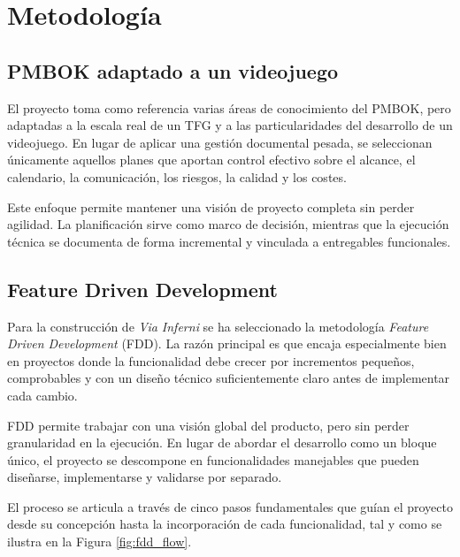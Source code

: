 \chapter{Metodología}

\begin{abstract}
En este capítulo se expone el marco metodológico que ha guiado el desarrollo de
\textit{Via Inferni}. La propuesta combina prácticas de planificación inspiradas en
PMBOK, un enfoque iterativo basado en FDD y una gestión del código orientada a mantener
trazabilidad y estabilidad durante el desarrollo.
\end{abstract}

\section{PMBOK adaptado a un videojuego}
El proyecto toma como referencia varias áreas de conocimiento del PMBOK, pero adaptadas a
la escala real de un TFG y a las particularidades del desarrollo de un videojuego. En
lugar de aplicar una gestión documental pesada, se seleccionan únicamente aquellos planes
que aportan control efectivo sobre el alcance, el calendario, la comunicación, los
riesgos, la calidad y los costes.

Este enfoque permite mantener una visión de proyecto completa sin perder agilidad. La
planificación sirve como marco de decisión, mientras que la ejecución técnica se documenta
de forma incremental y vinculada a entregables funcionales.

\section{Feature Driven Development}
Para la construcción de \textit{Via Inferni} se ha seleccionado la metodología
\textit{Feature Driven Development} (FDD). La razón principal es que encaja especialmente
bien en proyectos donde la funcionalidad debe crecer por incrementos pequeños,
comprobables y con un diseño técnico suficientemente claro antes de implementar cada
cambio.

FDD permite trabajar con una visión global del producto, pero sin perder granularidad en
la ejecución. En lugar de abordar el desarrollo como un bloque único, el proyecto se
descompone en funcionalidades manejables que pueden diseñarse, implementarse y validarse
por separado.

El proceso se articula a través de cinco pasos fundamentales que guían el proyecto desde
su concepción hasta la incorporación de cada funcionalidad, tal y como se ilustra en la
Figura \ref{fig:fdd_flow}.

